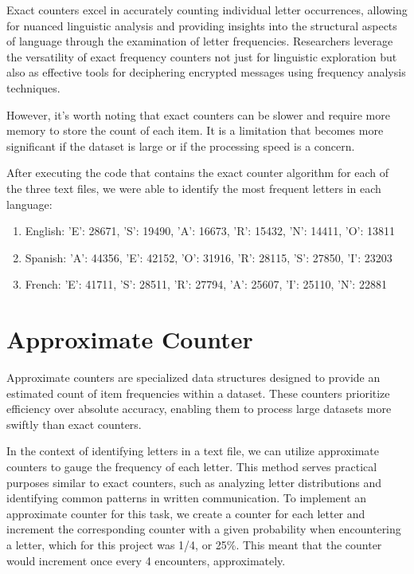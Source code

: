 \documentclass[]{revdetua}
\begin{document}
Exact counters excel in accurately counting individual letter occurrences, allowing for nuanced linguistic analysis and providing insights into the structural aspects of language through the examination of letter frequencies. Researchers leverage the versatility of exact frequency counters not just for linguistic exploration but also as effective tools for deciphering encrypted messages using frequency analysis techniques.

However, it’s worth noting that exact counters can be slower and require more memory to store the count of each item. It is a limitation that becomes more significant if the dataset is large or if the processing speed is a concern.

After executing the code that contains the exact counter algorithm for each of the three text files, we were able to identify the most frequent letters in each language:
\begin{enumerate}
    \item English: 'E': 28671, 'S': 19490, 'A': 16673, 'R': 15432, 'N': 14411, 'O': 13811
    \item Spanish: 'A': 44356, 'E': 42152, 'O': 31916, 'R': 28115, 'S': 27850, 'I': 23203
    \item French:  'E': 41711, 'S': 28511, 'R': 27794, 'A': 25607, 'I': 25110, 'N': 22881
\end{enumerate}

\section{Approximate Counter}

Approximate counters are specialized data structures designed to provide an estimated count of item frequencies within a dataset. These counters prioritize efficiency over absolute accuracy, enabling them to process large datasets more swiftly than exact counters.

In the context of identifying letters in a text file, we can utilize approximate counters to gauge the frequency of each letter. This method serves practical purposes similar to exact counters, such as analyzing letter distributions and identifying common patterns in written communication. To implement an approximate counter for this task, we create a counter for each letter and increment the corresponding counter with a given probability when encountering a letter, which for this project was 1/4, or 25\%. This meant that the counter would increment once every 4 encounters, approximately. 
\end{document}
